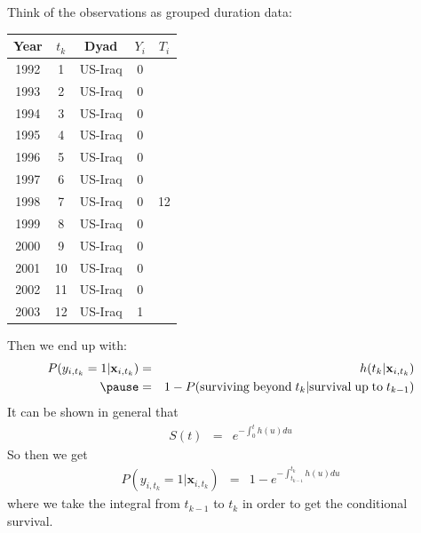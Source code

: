 \documentclass{beamer}
\begin{document}
\begin{frame}
Think of the observations as grouped duration data:
\pause
\begin{table}
\begin{center}
\begin{tabular}{|c|c|c|c|c|}
\hline
Year & $t_k$ & Dyad & $Y_i$ & $T_i$\\
\hline
1992 & 1 & US-Iraq & 0 & \\
1993 & 2 & US-Iraq & 0 & \\
1994 & 3 & US-Iraq & 0 & \\
1995 & 4 & US-Iraq & 0 & \\
1996 & 5 & US-Iraq & 0 & \\
1997 & 6 & US-Iraq & 0 & \\
1998 & 7 & US-Iraq & 0 & 12\\
1999 & 8 & US-Iraq & 0 & \\
2000 & 9 & US-Iraq & 0 & \\
2001 & 10 & US-Iraq & 0 & \\
2002 & 11 & US-Iraq & 0 & \\
2003 & 12 & US-Iraq & 1 & \\
\hline
\end{tabular}
\end{center}
\end{table}
\end{frame}

\begin{frame}
Then we end up with:
\begin{eqnarray*}
P(y_{i,t_k} = 1 | \mathbf{x}_{i,t_k}) &=& h(t_k | \mathbf{x}_{i,t_k}) \\
\pause
&=& 1 - P(\mathrm{surviving \;  beyond} \; t_k | \mathrm{survival \;
up \; to} \; t_{k-1})
\end{eqnarray*}
\pause
It can be shown in general that 
\begin{eqnarray*}
S(t) &=& e^{-\int_0^t h(u) du}
\end{eqnarray*}
\pause
So then we get
\begin{eqnarray*}
P(y_{i,t_k} = 1 | \mathbf{x}_{i,t_k}) &=& 1 -  e^{-\int_{t_{k-1}}^{t_k} h(u) du}
\end{eqnarray*}
where we take the integral from $t_{k-1}$ to $t_k$ in order to get the
conditional survival.
\end{frame}
\end{document}

